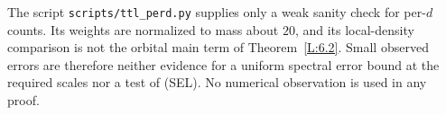 \begin{remark}
The script \texttt{scripts/ttl\_perd.py} supplies only a weak sanity
check for per-$d$ counts.  Its weights are normalized to mass about
$20$, and its local-density comparison is not the orbital main term
of Theorem~\ref{L:6.2}.  Small observed errors are therefore neither
evidence for a uniform spectral error bound at the required scales
nor a test of (SEL).  No numerical observation is used in any proof.
\end{remark}
